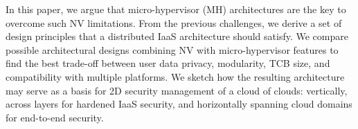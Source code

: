 \documentclass{sig-alternate}
\begin{document}
{In this paper, we argue that micro-hypervisor (MH) architectures are the key to overcome such NV limitations. 
From the previous challenges, we derive a set of design principles that a distributed IaaS architecture should satisfy. 
We compare possible architectural designs combining NV with micro-hypervisor features to find the best trade-off between user data privacy, modularity, TCB size, and compatibility with multiple platforms. 
We sketch how the resulting architecture may serve as a basis for 2D security management of a cloud of clouds: vertically, across layers for hardened IaaS security, and horizontally spanning cloud domains for end-to-end security.
}


%
%
%
%
%
%
%
%
%
%
\end{document}
